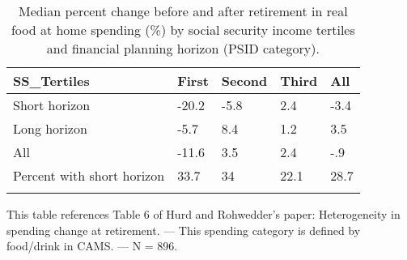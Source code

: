 \begin{table}[tbp] \centering
{}

\caption{Median percent change before and after retirement in real food at home spending (\%) by social security income tertiles and financial planning horizon (PSID category).}
\begin{tabularx}{\textwidth}{lCCCC}

\toprule
{SS\_Tertiles}&{First}&{Second}&{Third}&{All} \tabularnewline
\midrule\addlinespace[1.5ex]
Short horizon&-20.2&-5.8&2.4&-3.4 \tabularnewline
Long horizon&-5.7&8.4&1.2&3.5 \tabularnewline
All&-11.6&3.5&2.4&-.9 \tabularnewline
Percent with short horizon&33.7&34&22.1&28.7 \tabularnewline
\bottomrule \addlinespace[1.5ex]

\end{tabularx}
\begin{flushleft}
\footnotesize This table references Table 6 of Hurd and Rohwedder's paper: Heterogeneity in spending change at retirement. \linebreak --- \linebreak This spending category is defined by food/drink in CAMS. \linebreak --- \linebreak N = 896.
\end{flushleft}
\end{table}
